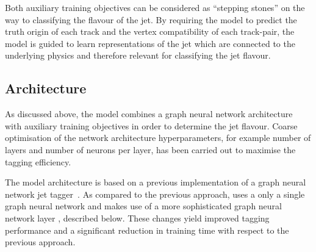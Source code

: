 Both auxiliary training objectives can be considered as ``stepping stones'' on the way to classifying the flavour of the jet. 
By requiring the model to predict the truth origin of each track and the vertex compatibility of each track-pair, the model is guided to learn representations of the jet which are connected to the underlying physics and therefore relevant for classifying the jet flavour. 




\subsection{Architecture}\label{sec:Architecture}

As discussed above, the \GNN model combines a graph neural network architecture~\cite{2020-gnn-in-particle-physics} with auxiliary training objectives in order to determine the jet flavour.
Coarse optimisation of the network architecture hyperparameters, for example number of layers and number of neurons per layer, has been carried out to maximise the tagging efficiency.

The model architecture is based on a previous implementation of a graph neural network jet tagger~\cite{serviansky2020set2graph}.
As compared to the previous approach, \GNN uses a only a single graph neural network and makes use of a more sophisticated graph neural network layer \cite{2021arXiv210514491B}, described below.
These changes yield improved tagging performance and a significant reduction in training time with respect to the previous approach.


